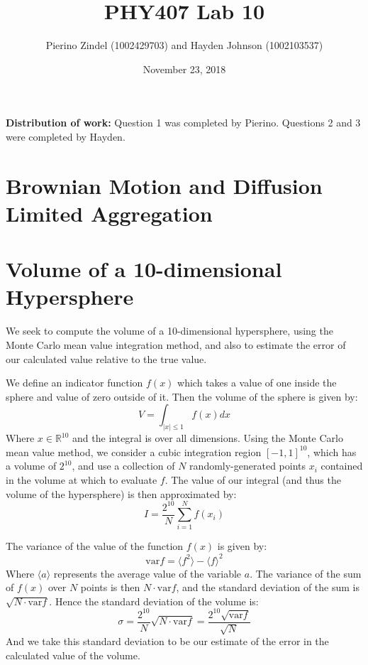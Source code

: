\documentclass{article}
\title{PHY407 Lab 10}
\author{Pierino Zindel (1002429703) and Hayden Johnson (1002103537)}
\date{November 23, 2018}
\begin{document}
\maketitle

\noindent \textbf{Distribution of work:} Question 1 was completed by Pierino. Questions 2 and 3 were completed by Hayden.

\section{Brownian Motion and Diffusion Limited Aggregation}

\section{Volume of a 10-dimensional Hypersphere}

We seek to compute the volume of a 10-dimensional hypersphere, using the Monte Carlo mean value integration method, and also to estimate the error of our calculated value relative to the true value.

We define an indicator function $f(x)$ which takes a value of one inside the sphere and value of zero outside of it. Then the volume of the sphere is given by:
\begin{equation}
	V = \int_{|x|\leq 1}f(x) dx
\end{equation}
Where $x \in \mathbb{R}^{10}$ and the integral is over all dimensions. Using the Monte Carlo mean value method, we consider a cubic integration region $[-1,1]^{10}$, which has a volume of $2^{10}$, and use a collection of $N$ randomly-generated points $x_i$ contained in the volume at which to evaluate $f$. The value of our integral (and thus the volume of the hypersphere) is then approximated by:
\begin{equation}
	I = \frac{2^{10}}{N}\sum_{i=1}^N f(x_i)
\end{equation}

The variance of the value of the function $f(x)$ is given by:
\begin{equation}
	\text{var}f = \langle f^2 \rangle - \langle f \rangle^2
\end{equation}
Where $\langle a \rangle$ represents the average value of the variable $a$. The variance of the sum of $f(x)$ over $N$ points is then $N\cdot\text{var}f$, and the standard deviation of the sum is $\sqrt{N\cdot\text{var}f}$. Hence the standard deviation of the volume is:
\begin{equation}
	\sigma = \frac{2^{10}}{N}\sqrt{N\cdot\text{var}f} = \frac{2^{10}\sqrt{\text{var}f}}{\sqrt{N}}
\end{equation}
And we take this standard deviation to be our estimate of the error in the calculated value of the volume.
\end{document}
